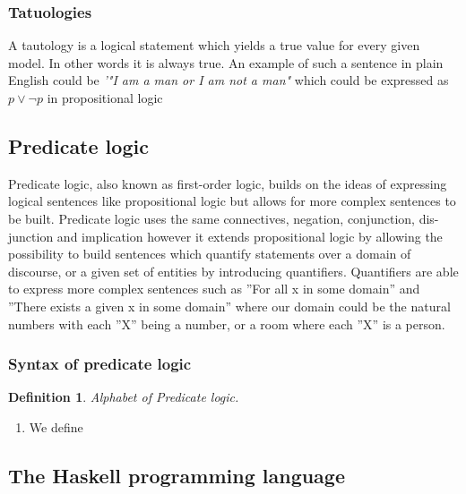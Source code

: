 \documentclass{article}%
\newtheorem{definition}{Definition}
\begin{document}
\subsubsection{Tatuologies}
A tautology is a logical statement which yields a true value for every given model. In other words it is always true. An example of such a sentence in plain English could be \textit{'"I am a man or I am not a man"} which could be expressed as $p \lor \neg{p}$ in propositional logic
\subsection{Predicate logic}

Predicate logic, also known as first-order logic, builds on the ideas of expressing logical sentences like propositional logic but allows for more complex sentences to be built. Predicate logic uses the same connectives, negation, conjunction, dis- junction and implication however it extends propositional logic by allowing the possibility to build sentences which quantify statements over a domain of discourse, or a given set of entities by introducing quantifiers. Quantifiers are able to express more complex sentences such as ”For all x in some domain” and ”There exists a given x in some domain” where our domain could be the natural numbers with each ”X” being a number, or a room where each ”X” is a person. 
\subsubsection{Syntax of predicate logic}
\begin{definition}
Alphabet of Predicate logic.
\end{definition}
\begin{enumerate}
\item We define 
\end{enumerate}

\subsection{The Haskell programming language}
\end{document}
